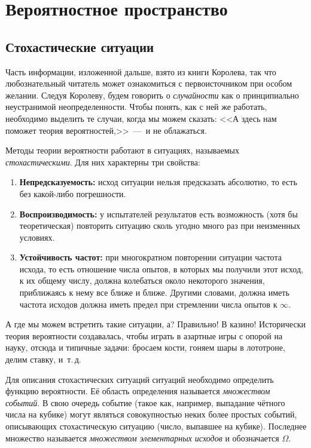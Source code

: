 \documentclass[../TV&MS.tex]{subfiles}
\begin{document}
\section{Вероятностное пространство}

\subsection{Стохастические ситуации}

\qquad Часть информации, изложенной дальше, взято из книги \cite{Korolev} Королева, 
так что любознательный читатель может ознакомиться с первоисточником при особом желании.
Следуя Королеву, будем говорить о \textit{случайности} как о принципиально
неустранимой неопределенности. Чтобы понять, как с ней же работать, необходимо
выделить те случаи, когда мы можем сказать: <<А здесь нам поможет теория вероятностей,>>~---~и не облажаться.

Методы теории вероятности работают в ситуациях, называемых \textit{стохастическими}. 
Для них характерны три свойства:
\begin{enumerate}[label={\bfseries \ding{118}\quad\arabic{enumi}:},leftmargin=*]
	\item \textbf{Непредсказуемость:} исход ситуации нельзя предсказать абсолютно, то
	есть без какой-либо погрешности.
	
	\item \textbf{Воспроизводимость:} у испытателей результатов есть возможность (хотя бы 
	теоретическая) повторить ситуацию сколь угодно много раз при неизменных условиях.
	
	\item \textbf{Устойчивость частот:} при многократном повторении ситуации частота исхода,
	то есть отношение числа опытов, в которых мы получили этот исход, к их общему числу,
	должна колебаться около некоторого значения, приближаясь к нему все ближе и ближе.
	Другими словами, должна иметь частота исходов должна иметь предел при стремлении
	числа опытов к $\infty$.
\end{enumerate}

А где мы можем встретить такие ситуации, а? Правильно! В казино!
Исторически теория вероятности создавалась, чтобы играть в азартные игры с опорой на науку, отсюда и типичные задачи: бросаем кости, гоняем шары в лототроне, делим ставку, и~т.\,д.

Для описания стохастических ситуаций ситуаций необходимо определить функцию вероятности. 
Её область определения называется \textit{множеством событий}. В свою очередь событие 
(такое как, например, выпадание чётного числа на кубике) могут являться совокупностью неких 
более простых событий, описывающих стохастическую ситуацию (число, выпавшее на кубике). 
Последнее множество называется \textit{множеством элементарных исходов} и обозначается $\Omega$.  
\end{document}
